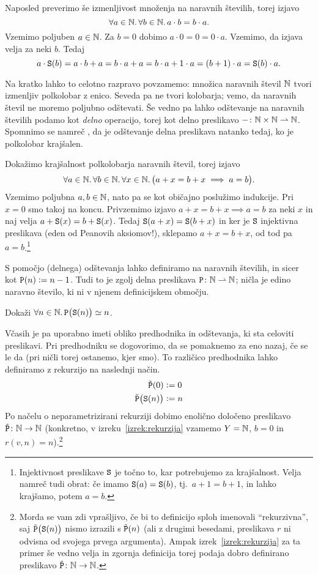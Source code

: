 Naposled preverimo še izmenljivost množenja na naravnih številih, torej izjavo
\[\forall a \in \mathbb{N} .\,\forall b \in \mathbb{N} .\,{a \cdot b = b \cdot a}.\]
Vzemimo poljuben $a \in \mathbb{N}$. Za $b = 0$ dobimo $a \cdot 0 = 0 = 0 \cdot a$. Vzemimo, da izjava velja za neki $b$. Tedaj
\[a \cdot \mathtt{S}(b) = a \cdot b + a = b \cdot a + a = b \cdot a + 1 \cdot a = (b + 1) \cdot a = \mathtt{S}(b) \cdot a.\]

Na kratko lahko to celotno razpravo povzamemo: množica naravnih števil $\mathbb{N}$ tvori izmenljiv polkolobar z enico.  Seveda pa ne tvori kolobarja; vemo, da naravnih števil ne moremo poljubno odštevati. Še vedno pa lahko odštevanje na naravnih številih podamo kot \emph{delno} operacijo, torej kot delno preslikavo $-\colon \mathbb{N} \times \mathbb{N} \mathrel{\rightharpoonup} \mathbb{N}$. Spomnimo se namreč , da je odštevanje delna preslikava natanko tedaj, ko je polkolobar krajšalen.

Dokažimo krajšalnost polkolobarja naravnih števil, torej izjavo
\[\forall a \in \mathbb{N} .\,\forall b \in \mathbb{N} .\,\forall x \in \mathbb{N} .\,\big(a + x = b + x \implies a = b\big).\]
Vzemimo poljubna $a, b \in \mathbb{N}$, nato pa se kot običajno poslužimo indukcije. Pri $x = 0$ smo takoj na koncu. Privzemimo izjavo $a + x = b + x \implies a = b$ za neki $x$ in naj velja $a + \mathtt{S}(x) = b + \mathtt{S}(x)$. Tedaj $\mathtt{S}(a + x) = \mathtt{S}(b + x)$ in ker je $\mathtt{S}$ injektivna preslikava (eden od Peanovih aksiomov!), sklepamo $a + x = b + x$, od tod pa $a = b$.\footnote{Injektivnost preslikave $\mathtt{S}$ je točno to, kar potrebujemo za krajšalnost. Velja namreč tudi obrat: če imamo $\mathtt{S}(a) = \mathtt{S}(b)$, tj.~$a + 1 = b + 1$, in lahko krajšamo, potem $a = b$.}

S pomočjo (delnega) odštevanja lahko definiramo  na naravnih številih, in sicer kot $\mathtt{P}(n) \mathrel{\mathop:}= n - 1$. Tudi to je zgolj delna preslikava $\mathtt{P}\colon \mathbb{N} \mathrel{\rightharpoonup} \mathbb{N}$; ničla je edino naravno število, ki ni v njenem definicijskem območju.

\begin{vaja}
Dokaži $\forall n \in \mathbb{N} .\,{\mathtt{P}\big(\mathtt{S}(n)\big) \simeq n}$.
\end{vaja}

Včasih je pa uporabno imeti obliko predhodnika in odštevanja, ki sta celoviti preslikavi. Pri predhodniku se dogovorimo, da se pomaknemo za eno nazaj, če se le da (pri ničli torej ostanemo, kjer smo). To različico predhodnika lahko definiramo z rekurzijo na naslednji način.
\begin{align*}
\tilde{\mathtt{P}}(0) &\mathrel{\mathop:}= 0 \\
\tilde{\mathtt{P}}\big(\mathtt{S}(n)\big) &\mathrel{\mathop:}= n
\end{align*}
Po načelu o neparametrizirani rekurziji dobimo enolično določeno preslikavo $\tilde{\mathtt{P}}\colon \mathbb{N} \to \mathbb{N}$ (konkretno, v izreku~\ref{izrek:rekurzija} vzamemo $Y = \mathbb{N}$, $b = 0$ in $r(v, n) = n$).\footnote{Morda se vam zdi vprašljivo, če bi to definicijo sploh imenovali ``rekurzivna'', saj $\tilde{\mathtt{P}}\big(\mathtt{S}(n)\big)$ nismo izrazili s $\tilde{\mathtt{P}}(n)$ (ali z drugimi besedami, preslikava $r$ ni odvisna od svojega prvega argumenta). Ampak izrek~\ref{izrek:rekurzija} za ta primer še vedno velja in zgornja definicija torej podaja dobro definirano preslikavo $\tilde{\mathtt{P}}\colon \mathbb{N} \to \mathbb{N}$.}

